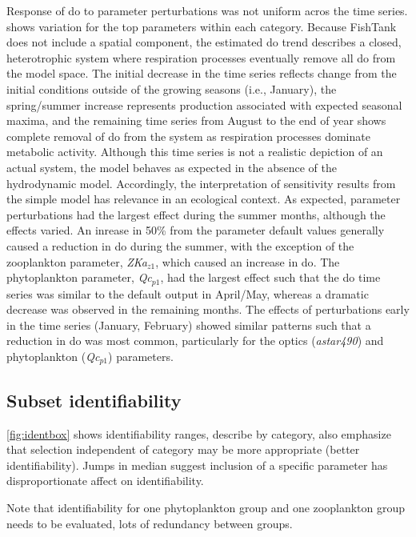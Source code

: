 \documentclass[letterpaper,12pt,oneside]{article}\usepackage[]{graphicx}\usepackage[]{color}
\begin{document}
Response of \ac{do} to parameter perturbations was not uniform acros the time series.   shows variation for the top parameters within each category.  Because FishTank does not include a spatial component, the estimated \ac{do} trend describes a closed, heterotrophic system where respiration processes eventually remove all \ac{do} from the model space.  The initial decrease in the time series reflects change from the initial conditions outside of the growing seasons (i.e., January), the spring/summer increase represents production associated with expected seasonal maxima, and the remaining time series from August to the end of year shows complete removal of \ac{do} from the system as respiration processes dominate metabolic activity. Although this time series is not a realistic depiction of an actual system, the model behaves as expected in the absence of the hydrodynamic model.  Accordingly, the interpretation of sensitivity results from the simple model has relevance in an ecological context.  As expected, parameter perturbations had the largest effect during the summer months, although the effects varied.  An inrease in 50\% from the parameter default values generally caused a reduction in \ac{do} during the summer, with the exception of the zooplankton parameter, \textit{ZKa$_{z1}$}, which caused an increase in \ac{do}.  The phytoplankton parameter, \textit{Qc$_{p1}$}, had the largest effect such that the \ac{do} time series was similar to the default output in April/May, whereas a dramatic decrease was observed in the remaining months.  The effects of perturbations early in the time series (January, February) showed similar patterns such that a reduction in \ac{do} was most common, particularly for the optics (\textit{astar490}) and phytoplankton (\textit{Qc$_{p1}$}) parameters.

\subsection{Subset identifiability}

\cref{fig:identbox} shows identifiability ranges, describe by category, also emphasize that selection independent of category may be more appropriate (better identifiability).  Jumps in median suggest inclusion of a specific parameter has disproportionate affect on identifiability.   

Note that identifiability for one phytoplankton group and one zooplankton group needs to be evaluated, lots of redundancy between groups. 
\end{document}
